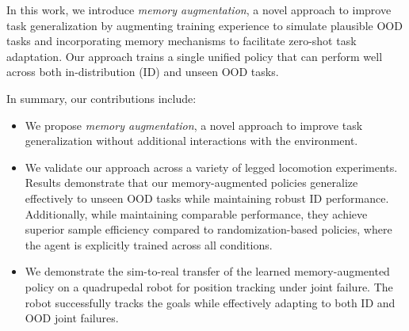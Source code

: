 In this work, we introduce \textit{memory augmentation}, a novel approach to improve task generalization by augmenting training experience to simulate plausible OOD tasks and incorporating memory mechanisms to facilitate zero-shot task adaptation.
Our approach trains a single unified policy that can perform well across both in-distribution (ID) and unseen OOD tasks.

In summary, our contributions include:
\begin{itemize}
    \item We propose \textit{memory augmentation}, a novel approach to improve task generalization without additional interactions with the environment.
    \item We validate our approach across a variety of legged locomotion experiments. Results demonstrate that our memory-augmented policies generalize effectively to unseen OOD tasks while maintaining robust ID performance. Additionally, while maintaining comparable performance, they achieve superior sample efficiency compared to randomization-based policies, where the agent is explicitly trained across all conditions.
    \item We demonstrate the sim-to-real transfer of the learned memory-augmented policy on a quadrupedal robot for position tracking under joint failure.
    The robot successfully tracks the goals while effectively adapting to both ID and OOD joint failures.
\end{itemize}